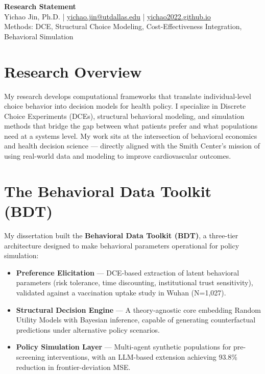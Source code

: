 \documentclass[11pt,a4paper]{article}
\begin{document}
\pagestyle{empty}

\begin{center}
    {\Large \bfseries \sffamily \color{slate} Research Statement} \\
    \vspace{0.2cm}
    {\small Yichao Jin, Ph.D. \quad | \quad \href{mailto:yichao.jin@utdallas.edu}{yichao.jin@utdallas.edu} \quad | \quad \href{https://yichao2022.github.io}{yichao2022.github.io}} \\
    {\small Methods: DCE, Structural Choice Modeling, Cost-Effectiveness Integration, Behavioral Simulation}
\end{center}

\vspace{0.15cm}

\section*{Research Overview}

My research develops computational frameworks that translate individual-level choice behavior into decision models for health policy. I specialize in Discrete Choice Experiments (DCEs), structural behavioral modeling, and simulation methods that bridge the gap between what patients prefer and what populations need at a systems level. My work sits at the intersection of behavioral economics and health decision science --- directly aligned with the Smith Center's mission of using real-world data and modeling to improve cardiovascular outcomes.

\section*{The Behavioral Data Toolkit (BDT)}

My dissertation built the \textbf{Behavioral Data Toolkit (BDT)}, a three-tier architecture designed to make behavioral parameters operational for policy simulation:

\begin{itemize}[leftmargin=*, nosep]
    \item \textbf{Preference Elicitation} --- DCE-based extraction of latent behavioral parameters (risk tolerance, time discounting, institutional trust sensitivity), validated against a vaccination uptake study in Wuhan (N=1,027).
    \item \textbf{Structural Decision Engine} --- A theory-agnostic core embedding Random Utility Models with Bayesian inference, capable of generating counterfactual predictions under alternative policy scenarios.
    \item \textbf{Policy Simulation Layer} --- Multi-agent synthetic populations for pre-screening interventions, with an LLM-based extension achieving 93.8\% reduction in frontier-deviation MSE.
\end{itemize}
\end{document}
